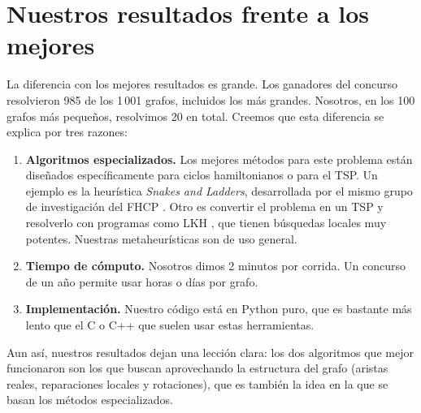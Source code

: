 \section{Nuestros resultados frente a los mejores}
La diferencia con los mejores resultados es grande. Los ganadores del concurso resolvieron 985 de
los 1\,001 grafos, incluidos los más grandes. Nosotros, en los 100 grafos más pequeños, resolvimos
20 en total. Creemos que esta diferencia se explica por tres razones:
\begin{enumerate}
  \item \textbf{Algoritmos especializados.} Los mejores métodos para este problema están
        diseñados específicamente para ciclos hamiltonianos o para el TSP. Un ejemplo es la
        heurística \emph{Snakes and Ladders}, desarrollada por el mismo grupo de investigación del
        FHCP \cite{slh2014}. Otro es convertir el problema en un TSP y resolverlo con programas como
        LKH \cite{lkh2000}, que tienen búsquedas locales muy potentes. Nuestras metaheurísticas son
        de uso general.
  \item \textbf{Tiempo de cómputo.} Nosotros dimos 2 minutos por corrida. Un concurso de un año
        permite usar horas o días por grafo.
  \item \textbf{Implementación.} Nuestro código está en Python puro, que es bastante más lento que
        el C o C++ que suelen usar estas herramientas.
\end{enumerate}

Aun así, nuestros resultados dejan una lección clara: los dos algoritmos que mejor funcionaron
son los que buscan aprovechando la estructura del grafo (aristas reales, reparaciones locales y
rotaciones), que es también la idea en la que se basan los métodos especializados.
